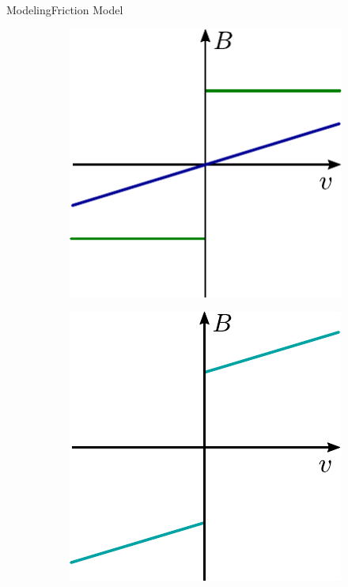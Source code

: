 \begin{frame}{Modeling}{Friction Model}
  \small
  \vspace{-1cm}
  \begin{figure}[H]\hspace{-3cm}
    \begin{minipage}{0.3\linewidth}
      \begin{figure}[H]
        \includegraphics[width=.8\linewidth]{figures/coulombViscous1}
      \end{figure}        
    \end{minipage}%
    \begin{minipage}{0.3\linewidth}
      \begin{figure}[H]
        \includegraphics[width=.8\linewidth]{figures/coulombViscous2}

\end{figure}
\end{minipage}
\end{figure}
\end{frame}
